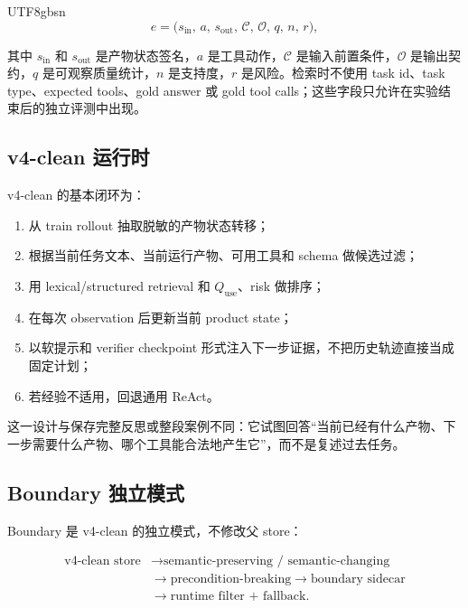 \documentclass[a4paper,11pt]{article}
\begin{document}
\begin{CJK*}{UTF8}{gbsn}
\begin{equation}
e=\bigl(s_{\mathrm{in}},\,a,\,s_{\mathrm{out}},\,\mathcal{C},\,\mathcal{O},\,q,\,n,\,r\bigr),
\end{equation}

其中 $s_{\mathrm{in}}$ 和 $s_{\mathrm{out}}$ 是产物状态签名，$a$ 是工具动作，$\mathcal{C}$ 是输入前置条件，$\mathcal{O}$ 是输出契约，$q$ 是可观察质量统计，$n$ 是支持度，$r$ 是风险。检索时不使用 task id、task type、expected tools、gold answer 或 gold tool calls；这些字段只允许在实验结束后的独立评测中出现。

\subsection{v4-clean 运行时}

v4-clean 的基本闭环为：

\begin{enumerate}
  \item 从 train rollout 抽取脱敏的产物状态转移；
  \item 根据当前任务文本、当前运行产物、可用工具和 schema 做候选过滤；
  \item 用 lexical/structured retrieval 和 $Q_{\mathrm{use}}$、risk 做排序；
  \item 在每次 observation 后更新当前 product state；
  \item 以软提示和 verifier checkpoint 形式注入下一步证据，不把历史轨迹直接当成固定计划；
  \item 若经验不适用，回退通用 ReAct。
\end{enumerate}

这一设计与保存完整反思或整段案例不同：它试图回答“当前已经有什么产物、下一步需要什么产物、哪个工具能合法地产生它”，而不是复述过去任务。

\subsection{Boundary 独立模式}

Boundary 是 v4-clean 的独立模式，不修改父 store：

\begin{equation}
\begin{aligned}
\text{v4-clean store}
&\longrightarrow \text{semantic-preserving / semantic-changing}\\
&\longrightarrow \text{precondition-breaking}\longrightarrow \text{boundary sidecar}\\
&\longrightarrow \text{runtime filter + fallback}.
\end{aligned}
\end{equation}


\end{CJK*}
\end{document}
